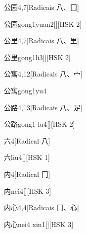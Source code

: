 \begin{entry}{公园}{4,7}[Radicais ⼋、⼞]
  \begin{phonetics}{公园}{gong1yuan2}[][HSK 2]
  \end{phonetics}
\end{entry}

\begin{entry}{公里}{4,7}[Radicais ⼋、⾥]
  \begin{phonetics}{公里}{gong1li3}[][HSK 2]
  \end{phonetics}
\end{entry}

\begin{entry}{公寓}{4,12}[Radicais ⼋、⼧]
  \begin{phonetics}{公寓}{gong1yu4}
  \end{phonetics}
\end{entry}

\begin{entry}{公路}{4,13}[Radicais ⼋、⾜]
  \begin{phonetics}{公路}{gong1 lu4}[][HSK 2]
  \end{phonetics}
\end{entry}

\begin{entry}{六}{4}[Radical ⼋]
  \begin{phonetics}{六}{liu4}[][HSK 1]
  \end{phonetics}
\end{entry}

\begin{entry}{内}{4}[Radical ⼌]
  \begin{phonetics}{内}{nei4}[][HSK 3]
  \end{phonetics}
\end{entry}

\begin{entry}{内心}{4,4}[Radicais ⼌、⼼]
  \begin{phonetics}{内心}{nei4 xin1}[][HSK 3]
  \end{phonetics}
\end{entry}


